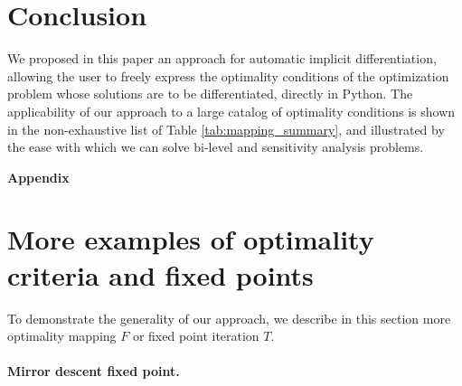 \documentclass{article}
\begin{document}
\section{Conclusion}

We proposed in this paper an approach for automatic implicit differentiation,
allowing the user to freely express the optimality conditions of the
optimization problem whose solutions are to be differentiated, 
directly in Python. The applicability of our approach to a large catalog of
optimality conditions is shown in the non-exhaustive list of Table \ref{tab:mapping_summary}, and illustrated by the ease with which
we can solve bi-level and sensitivity analysis problems. 





%
%


\clearpage

\appendix

\begin{center}
\huge \bfseries Appendix
\end{center}

\section{More examples of optimality criteria and fixed points}
\label{appendix:more_fixed_points}

To demonstrate the generality of our approach, we describe in this section more
optimality mapping $F$ or fixed point iteration $T$.

\paragraph{Mirror descent fixed point.}
\end{document}
